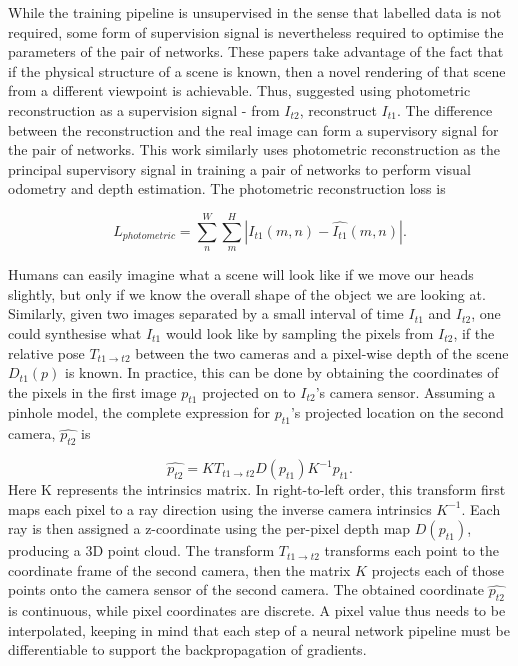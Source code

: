 While the training pipeline is unsupervised in the sense that labelled data is not required, some form of supervision signal is nevertheless required to optimise the parameters of the pair of networks. These papers take advantage of the fact that if the physical structure of a scene is known, then a novel rendering of that scene from a different viewpoint is achievable. Thus, \cite{garg2016unsupervised} suggested using photometric reconstruction as a supervision signal - from $I_{t2}$, reconstruct $I_{t1}$. The difference between the reconstruction and the real image can form a supervisory signal for the pair of networks. This work similarly uses photometric reconstruction as the principal supervisory signal in training a pair of networks to perform visual odometry and depth estimation. The photometric reconstruction loss is


\begin{equation}
    L_{photometric} = \sum_n^W \sum_m^H |I_{t1}(m,n) - \hat{I_{t1}}(m,n)|.
    \label{photometricloss}
\end{equation}


Humans can easily imagine what a scene will look like if we move our heads slightly, but only if we know the overall shape of the object we are looking at. Similarly, given two images separated by a small interval of time $I_{t1}$ and $I_{t2}$, one could synthesise what $I_{t1}$ would look like by sampling the pixels from $I_{t2}$, if the relative pose $T_{t1\rightarrow t2}$ between the two cameras and a pixel-wise depth of the scene $D_{t1}(p)$ is known. In practice, this can be done by obtaining the coordinates of the pixels in the first image $p_{t1}$ projected on to $I_{t2}$'s camera sensor. Assuming a pinhole model, the complete expression for $p_{t1}$'s projected location on the second camera, $\hat{p_{t2}}$ is 

\begin{equation}
\hat{p_{t2}} = KT_{t1\rightarrow t2} D(p_{t1}) K^{-1} p_{t1}.
\end{equation}
Here K represents the intrinsics matrix. In right-to-left order, this transform first maps each pixel to a ray direction using the inverse camera intrinsics $K^{-1}$. Each ray is then assigned a z-coordinate using the per-pixel depth map $D(p_{t1})$, producing a 3D point cloud. The transform $T_{t1 \rightarrow t2}$ transforms each point to the coordinate frame of the second camera, then the matrix $K$ projects each of those points onto the camera sensor of the second camera. The obtained coordinate $\hat{p_{t2}}$ is continuous, while pixel coordinates are discrete. A pixel value thus needs to be interpolated, keeping in mind that each step of a neural network pipeline must be differentiable to support the backpropagation of gradients. 

